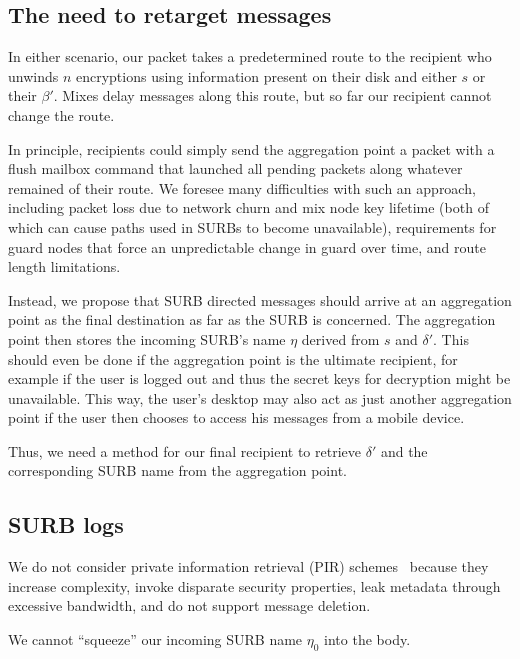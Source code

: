 \documentclass[twoside,letterpaper]{llncs}
\begin{document}
\subsection{The need to retarget messages}

In either scenario, our packet takes a predetermined route to the
recipient who unwinds $n$ encryptions using information present on
their disk and either $s$ or their $\beta'$.  Mixes delay
messages along this route, but so far our recipient cannot change
the route. 

In principle, recipients could simply send the aggregation point
a packet with a flush mailbox command that launched all pending
packets along whatever remained of their route.  We foresee many
difficulties with such an approach, including packet loss due to
network churn and mix node key lifetime (both of which can cause
paths used in SURBs to become unavailable), requirements for guard
nodes that force an unpredictable change in guard over time,
and route length limitations.

Instead, we propose that SURB directed messages should arrive at
an aggregation point as the final destination as far as the SURB
is concerned. The aggregation point then stores 
the incoming SURB's name $\eta$ derived from $s$ and $\delta'$.
This should even be done if the aggregation point is the ultimate
recipient, for example if the user is logged out and thus the
secret keys for decryption might be unavailable.  This way, the
user's desktop may also act as just another aggregation point if
the user then chooses to access his messages from a mobile device.

Thus, we need a method for our final recipient to retrieve
$\delta'$ and the corresponding SURB name from the aggregation point.


\subsection{SURB logs}

We do not consider private information retrieval (PIR)
schemes~\cite{pir} because they increase complexity, invoke disparate
security properties, leak metadata through excessive bandwidth, and do
not support message deletion.

We cannot ``squeeze'' our incoming SURB name $\eta_0$ into the body.
\end{document}
